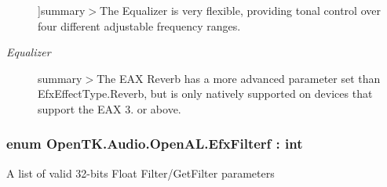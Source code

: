 \begin{Desc}
\begin{description}
{}]summary$>$The Equalizer is very flexible, providing tonal control over four different adjustable frequency ranges.\item[{\em 
\hypertarget{namespace_open_t_k_1_1_audio_1_1_open_a_l_a224be2a7f650eba92828d53342bfbc30ab9fb964f2edf7245f6c0eb6ea5562c82}{Equalizer}\label{namespace_open_t_k_1_1_audio_1_1_open_a_l_a224be2a7f650eba92828d53342bfbc30ab9fb964f2edf7245f6c0eb6ea5562c82}
}]summary$>$The E\-A\-X Reverb has a more advanced parameter set than Efx\-Effect\-Type.\-Reverb, but is only natively supported on devices that support the E\-A\-X 3. or above.\end{description}
\end{Desc}
\hypertarget{namespace_open_t_k_1_1_audio_1_1_open_a_l_a6a389aa5e465025fe4eb3fba1603fd6b}{
\subsubsection[{Efx\-Filterf}]{\setlength{\rightskip}{0pt plus 5cm}enum {\bf Open\-T\-K.\-Audio.\-Open\-A\-L.\-Efx\-Filterf} \-: int}}\label{namespace_open_t_k_1_1_audio_1_1_open_a_l_a6a389aa5e465025fe4eb3fba1603fd6b}


A list of valid 32-\/bits Float Filter/\-Get\-Filter parameters

